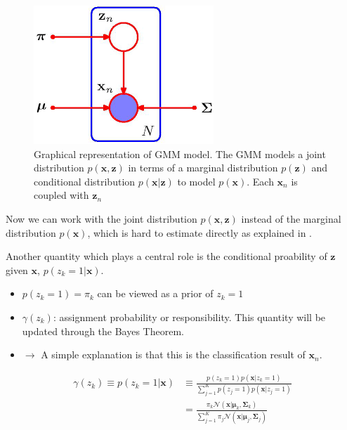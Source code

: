 \begin{figure}[h]
	\begin{center}			
		\includegraphics[scale=0.4]{./images/gmm.png}
	\end{center}
	\caption{Graphical representation of GMM model. The GMM models a joint distribution $p(\mathbf{x}, \mathbf{z})$ in terms of a marginal distribution $p(\mathbf{z})$ and conditional distribution $p(\mathbf{x}|\mathbf{z})$ to model $p(\mathbf{x})$. Each $\mathbf{x}_n$ is coupled with $\mathbf{z}_n$}
	\label{fig:gmm}
\end{figure}
Now we can work with the joint distribution $p(\mathbf{x,z})$ instead of the marginal distribution $p(\mathbf{x})$, which is hard to estimate directly as explained in . 

Another quantity which plays a central role is the conditional proability of $\mathbf{z}$ given $\mathbf{x}$, $p(z_k=1|\mathbf{x})$. 
\begin{itemize}
\item $p(z_k=1) = \pi_k$ can be viewed as a prior of $z_k=1$
\item $\gamma(z_k)$: assignment probability or responsibility. This quantity will be updated through the Bayes Theorem.
\item[] $\rightarrow$  A simple explanation is that this is the classification result of $\mathbf{x}_n$.
\end{itemize}
\begin{align*}
\gamma(z_k) \equiv p(z_k=1|\mathbf{x}) & \equiv \frac{p(z_k=1)p(\mathbf{x}|z_k=1)}{\sum_{j=1}^{K}p(z_j=1)p(\mathbf{x}|z_j=1)} \\
& = \frac{\pi_k\mathcal{N}(\mathbf{x}|\boldsymbol{\mu}_k, \boldsymbol{\Sigma}_k)}{\sum_{j=1}^{K} \pi_j\mathcal{N}(\mathbf{x}|\boldsymbol{\mu}_j, \boldsymbol{\Sigma}_j)}
\end{align*}

